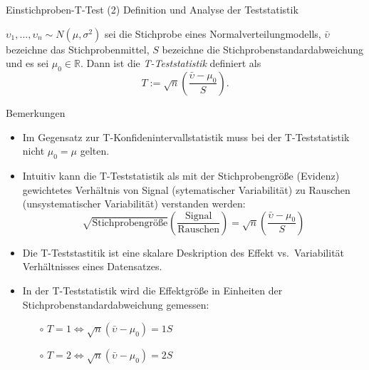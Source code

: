 \documentclass[
  8pt,
  ignorenonframetext,
]{beamer}
\providecommand{\tightlist}{%
  \setlength{\itemsep}{0pt}\setlength{\parskip}{0pt}}
\newcommand{\ups} {\upsilon}
\begin{document}
\begin{frame}{Einstichproben-T-Test \textbar{} (2) Definition und
Analyse der Teststatistik}
\protect\hypertarget{einstichproben-t-test-2-definition-und-analyse-der-teststatistik}{}
\footnotesize
\begin{definition}
\justifying
$\ups_1,...,\ups_n \sim N(\mu,\sigma^2)$ sei die Stichprobe eines Normalverteilungmodells,
$\bar{\ups}$ bezeichne das Stichprobenmittel, $S$ bezeichne die Stichprobenstandardabweichung
und es sei $\mu_0 \in \mathbb{R}$. Dann ist die \textit{T-Teststatistik} definiert als
\begin{equation}
T := \sqrt{n}\left(\frac{\bar{\ups} - \mu_0}{S} \right).
\end{equation}
\end{definition}

Bemerkungen

\begin{itemize}
\tightlist
\item
  Im Gegensatz zur T-Konfidenintervallstatistik muss bei der
  T-Teststatistik nicht \(\mu_0 = \mu\) gelten.
\item
  Intuitiv kann die T-Teststatistik als mit der Stichprobengröße
  (Evidenz) gewichtetes Verhältnis von Signal (sytematischer
  Variabilität) zu Rauschen (unsystematischer Variabilität) verstanden
  werden: \begin{equation}
  \sqrt{\mbox{Stichprobengröße}}\left(\frac{\mbox{Signal}}{\mbox{Rauschen}}\right)
  = \sqrt{n}\left(\frac{\bar{\ups} - \mu_0}{S}\right)
  \end{equation}
\item
  Die T-Teststastitik ist eine skalare Deskription des Effekt
  vs.~Variabilität Verhältnisses eines Datensatzes.
\item
  In der T-Teststatistik wird die Effektgröße in Einheiten der
  Stichprobenstandardabweichung gemessen:

  \begin{itemize}
  \footnotesize
  \item[$\circ$] $T = 1 \Leftrightarrow \sqrt{n}(\bar{\ups} - \mu_0) = 1 S$
  \item[$\circ$] $T = 2 \Leftrightarrow \sqrt{n}(\bar{\ups} - \mu_0) = 2 S$
  \end{itemize}
\end{itemize}
\end{frame}
\end{document}
